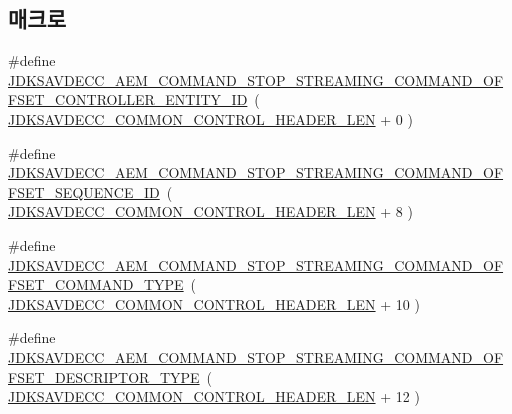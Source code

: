 \subsection*{매크로}
\begin{DoxyCompactItemize}
\item 
\#define \hyperlink{group__command__stop__streaming_gae2df888c7bfea3738615f05f74bf32ae}{J\+D\+K\+S\+A\+V\+D\+E\+C\+C\+\_\+\+A\+E\+M\+\_\+\+C\+O\+M\+M\+A\+N\+D\+\_\+\+S\+T\+O\+P\+\_\+\+S\+T\+R\+E\+A\+M\+I\+N\+G\+\_\+\+C\+O\+M\+M\+A\+N\+D\+\_\+\+O\+F\+F\+S\+E\+T\+\_\+\+C\+O\+N\+T\+R\+O\+L\+L\+E\+R\+\_\+\+E\+N\+T\+I\+T\+Y\+\_\+\+ID}~( \hyperlink{group__jdksavdecc__avtp__common__control__header_gaae84052886fb1bb42f3bc5f85b741dff}{J\+D\+K\+S\+A\+V\+D\+E\+C\+C\+\_\+\+C\+O\+M\+M\+O\+N\+\_\+\+C\+O\+N\+T\+R\+O\+L\+\_\+\+H\+E\+A\+D\+E\+R\+\_\+\+L\+EN} + 0 )
\item 
\#define \hyperlink{group__command__stop__streaming_ga60587c1caa2b5ca32d30306752c24474}{J\+D\+K\+S\+A\+V\+D\+E\+C\+C\+\_\+\+A\+E\+M\+\_\+\+C\+O\+M\+M\+A\+N\+D\+\_\+\+S\+T\+O\+P\+\_\+\+S\+T\+R\+E\+A\+M\+I\+N\+G\+\_\+\+C\+O\+M\+M\+A\+N\+D\+\_\+\+O\+F\+F\+S\+E\+T\+\_\+\+S\+E\+Q\+U\+E\+N\+C\+E\+\_\+\+ID}~( \hyperlink{group__jdksavdecc__avtp__common__control__header_gaae84052886fb1bb42f3bc5f85b741dff}{J\+D\+K\+S\+A\+V\+D\+E\+C\+C\+\_\+\+C\+O\+M\+M\+O\+N\+\_\+\+C\+O\+N\+T\+R\+O\+L\+\_\+\+H\+E\+A\+D\+E\+R\+\_\+\+L\+EN} + 8 )
\item 
\#define \hyperlink{group__command__stop__streaming_ga9b97c34e96e280daf3a313899abb1920}{J\+D\+K\+S\+A\+V\+D\+E\+C\+C\+\_\+\+A\+E\+M\+\_\+\+C\+O\+M\+M\+A\+N\+D\+\_\+\+S\+T\+O\+P\+\_\+\+S\+T\+R\+E\+A\+M\+I\+N\+G\+\_\+\+C\+O\+M\+M\+A\+N\+D\+\_\+\+O\+F\+F\+S\+E\+T\+\_\+\+C\+O\+M\+M\+A\+N\+D\+\_\+\+T\+Y\+PE}~( \hyperlink{group__jdksavdecc__avtp__common__control__header_gaae84052886fb1bb42f3bc5f85b741dff}{J\+D\+K\+S\+A\+V\+D\+E\+C\+C\+\_\+\+C\+O\+M\+M\+O\+N\+\_\+\+C\+O\+N\+T\+R\+O\+L\+\_\+\+H\+E\+A\+D\+E\+R\+\_\+\+L\+EN} + 10 )
\item 
\#define \hyperlink{group__command__stop__streaming_ga7dcc921aa0afc55f040e3ca494967ff1}{J\+D\+K\+S\+A\+V\+D\+E\+C\+C\+\_\+\+A\+E\+M\+\_\+\+C\+O\+M\+M\+A\+N\+D\+\_\+\+S\+T\+O\+P\+\_\+\+S\+T\+R\+E\+A\+M\+I\+N\+G\+\_\+\+C\+O\+M\+M\+A\+N\+D\+\_\+\+O\+F\+F\+S\+E\+T\+\_\+\+D\+E\+S\+C\+R\+I\+P\+T\+O\+R\+\_\+\+T\+Y\+PE}~( \hyperlink{group__jdksavdecc__avtp__common__control__header_gaae84052886fb1bb42f3bc5f85b741dff}{J\+D\+K\+S\+A\+V\+D\+E\+C\+C\+\_\+\+C\+O\+M\+M\+O\+N\+\_\+\+C\+O\+N\+T\+R\+O\+L\+\_\+\+H\+E\+A\+D\+E\+R\+\_\+\+L\+EN} + 12 )
\item 

\end{DoxyCompactItemize}
